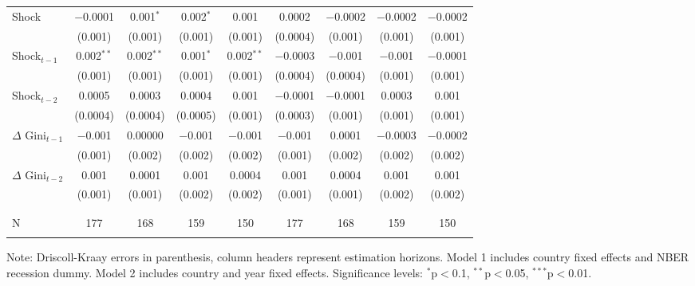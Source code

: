 \documentclass[12pt, a4paper]{article}
\begin{document}
\begin{table}[!htbp]
{\begin{tabular}{@{\extracolsep{5pt}}l cccccccc}
Shock & $-$0.0001 & 0.001$^{*}$ & 0.002$^{*}$ & 0.001 & 0.0002 & $-$0.0002 & $-$0.0002 & $-$0.0002 \\
 & (0.001) & (0.001) & (0.001) & (0.001) & (0.0004) & (0.001) & (0.001) & (0.001) \\ [0.5em]
 
Shock$_{t-1}$  & 0.002$^{**}$ & 0.002$^{**}$ & 0.001$^{*}$ & 0.002$^{**}$ & $-$0.0003 & $-$0.001 & $-$0.001 & $-$0.0001 \\
 & (0.001) & (0.001) & (0.001) & (0.001) & (0.0004) & (0.0004) & (0.001) & (0.001) \\ [0.5em]
 
Shock$_{t-2}$ & 0.0005 & 0.0003 & 0.0004 & 0.001 & $-$0.0001 & $-$0.0001 & 0.0003 & 0.001 \\
& (0.0004) & (0.0004) & (0.0005) & (0.001) & (0.0003) & (0.001) & (0.001) & (0.001) \\ [0.5em]

$\Delta$ Gini$_{t-1}$ & $-$0.001 & 0.00000 & $-$0.001 & $-$0.001 & $-$0.001 & 0.0001 & $-$0.0003 & $-$0.0002 \\ 
  & (0.001) & (0.002) & (0.002) & (0.002) & (0.001) & (0.002) & (0.002) & (0.002) \\ [0.5em]

$\Delta$ Gini$_{t-2}$ & 0.001 & 0.0001 & 0.001 & 0.0004 & 0.001 & 0.0004 & 0.001 & 0.001 \\ 
  & (0.001) & (0.001) & (0.002) & (0.002) & (0.001) & (0.001) & (0.002) & (0.002) \\ [1em]
\\[-1.8ex] \hline \\[-1.8ex] 
N & 177 & 168 & 159 & 150 & 177 & 168 & 159 & 150 \\ 
\hline \\[-1.8ex]
\end{tabular}
}
\begin{minipage}{\textwidth}
    \vspace{0.1cm} 
    \footnotesize  Note: Driscoll-Kraay errors in parenthesis, column headers represent estimation horizons. Model 1 includes country fixed effects and NBER recession dummy. Model 2 includes country and year fixed effects. Significance levels: $^{*}$p$<$0.1, $^{**}$p$<$0.05, $^{***}$p$<$0.01.
\end{minipage}
\end{table}
\newpage
\end{document}

